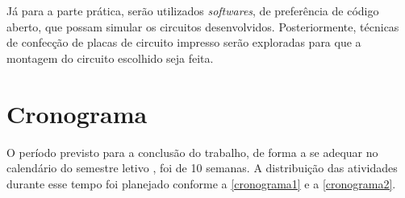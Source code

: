 \documentclass[
	12pt,				%
	oneside,			%
	a4paper,			%
  oldfontcommands,
	english,			%
	french,				%
	spanish,			%
	brazil,				%
	]{abntex2}
\begin{document}
Já para a parte prática, serão utilizados \emph{softwares}, de preferência de código aberto, que possam simular os circuitos desenvolvidos. Posteriormente, técnicas de confecção de placas de circuito impresso serão exploradas para que a montagem do circuito escolhido seja feita.

\section{Cronograma}

O período previsto para a conclusão do trabalho, de forma a se adequar no calendário do semestre letivo \cite{calendario}, foi de 10 semanas. A distribuição das atividades durante esse tempo foi planejado conforme a \autoref{cronograma1} e a \autoref{cronograma2}.

\begin{table}[htb]
\end{table}

\begin{table}[htb]
\end{table}

\end{document}
